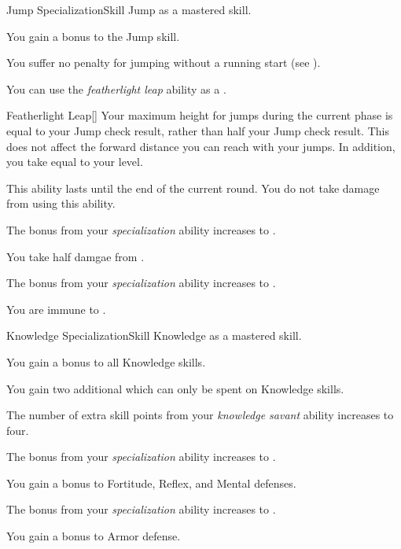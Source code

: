     \begin{feat}{Jump Specialization}{Skill}
        \featpre Jump as a mastered skill.

         You gain a  bonus to the Jump skill.

         You suffer no penalty for jumping without a running start (see ).

         You can use the \textit{featherlight leap} ability as a .
        \begin{freeability}{Featherlight Leap}[]
            Your maximum height for jumps during the current phase is equal to your Jump check result, rather than half your Jump check result.
            This does not affect the forward distance you can reach with your jumps.
            In addition, you take  equal to your level.

            \rankline
             This ability lasts until the end of the current round.
             You do not take damage from using this ability.
        \end{freeability}

         The bonus from your \textit{specialization} ability increases to .

         You take half damgae from .

         The bonus from your \textit{specialization} ability increases to .

         You are immune to .
    \end{feat}

    \begin{feat}{Knowledge Specialization}{Skill}
        \featpre Knowledge as a mastered skill.

         You gain a  bonus to all Knowledge skills.

         You gain two additional  which can only be spent on Knowledge skills.

         The number of extra skill points from your \textit{knowledge savant} ability increases to four.

         The bonus from your \textit{specialization} ability increases to .

         You gain a  bonus to Fortitude, Reflex, and Mental defenses. 

         The bonus from your \textit{specialization} ability increases to .

         You gain a  bonus to Armor defense.
    \end{feat}


